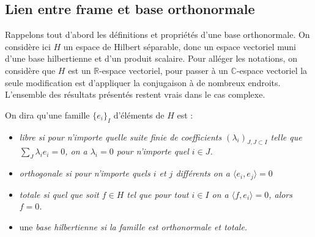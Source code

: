 \subsection{Lien entre frame et base orthonormale}
Rappelons tout d'abord les définitions et propriétés d'une base orthonormale. On considère ici $H$ un espace de Hilbert séparable, donc un espace vectoriel muni d'une base hilbertienne et d'un produit scalaire.
Pour alléger les notations, on considère que $H$ est un $\mathbb{R}$-espace vectoriel, pour passer à un $\mathbb{C}$-espace vectoriel la seule modification est d'appliquer la conjugaison à de nombreux endroits.
L'ensemble des résultats présentés restent vrais dans le cas complexe.
\begin{definition}
	On dira qu'une famille $\{e_i\}_I$ d'éléments de $H$ est :
	\begin{itemize}
		\item \it{libre} si pour n'importe quelle suite finie de coefficients $(\lambda_i)_{J, J\subset I}$ telle que $\sum_J \lambda_i e_i = 0$, on a $\lambda_i = 0$ pour n'importe quel $i \in J$.
		\item \it{orthogonale} si pour n'importe quels $i$ et $j$ différents on a $\langle e_i, e_j \rangle = 0$
		\item \it{totale} si quel que soit $f \in H$ tel que pour tout $i\in I$ on a $\langle f, e_i \rangle = 0$, alors $f=0$.
		\item une \it{base hilbertienne} si la famille est orthonormale et totale.
	\end{itemize}
\end{definition}

